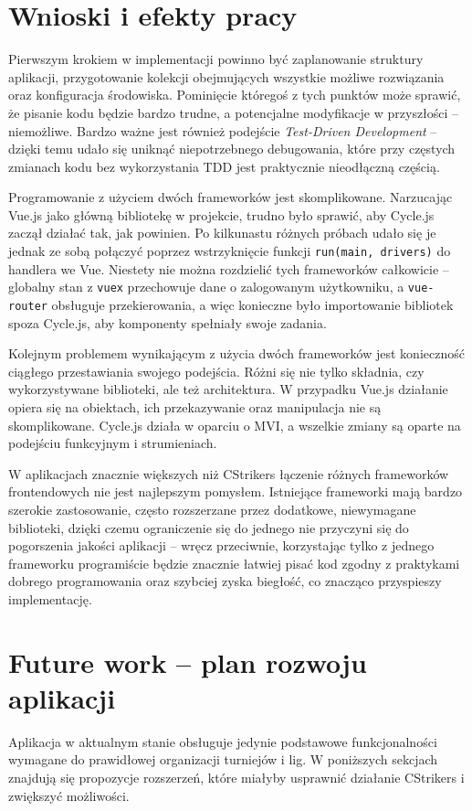 \documentclass[shortabstract]{iithesis}
\theoremstyle{definition} \newtheorem{definition}{Definicja}[]
\theoremstyle{remark} \newtheorem{remark}[definition]{Observation}
\theoremstyle{plain} \newtheorem{theorem}[definition]{Theorem}
\theoremstyle{plain} \newtheorem{lemma}[definition]{Lemma}
\begin{document}
\section{Wnioski i efekty pracy}
Pierwszym krokiem w implementacji powinno być zaplanowanie struktury aplikacji, przygotowanie kolekcji obejmujących wszystkie możliwe rozwiązania oraz konfiguracja środowiska. Pominięcie któregoś z tych punktów może sprawić, że pisanie kodu będzie bardzo trudne, a potencjalne modyfikacje w przyszłości -- niemożliwe. Bardzo ważne jest również podejście \textit{Test-Driven Development} -- dzięki temu udało się uniknąć niepotrzebnego debugowania, które przy częstych zmianach kodu bez wykorzystania TDD jest praktycznie nieodłączną częścią.

Programowanie z użyciem dwóch frameworków jest skomplikowane. Narzucając Vue.js jako główną bibliotekę w projekcie, trudno było sprawić, aby Cycle.js zaczął działać tak, jak powinien. Po kilkunastu różnych próbach udało się je jednak ze sobą połączyć poprzez wstrzyknięcie funkcji \texttt{run(main, drivers)} do handlera we Vue. Niestety nie można rozdzielić tych frameworków całkowicie -- globalny stan z \texttt{vuex} przechowuje dane o zalogowanym użytkowniku, a \texttt{vue-router} obsługuje przekierowania, a więc konieczne było importowanie bibliotek spoza Cycle.js, aby komponenty spełniały swoje zadania.

Kolejnym problemem wynikającym z użycia dwóch frameworków jest konieczność ciągłego przestawiania swojego podejścia. Różni się nie tylko składnia, czy wykorzystywane biblioteki, ale też architektura. W przypadku Vue.js działanie opiera się na obiektach, ich przekazywanie oraz manipulacja nie są skomplikowane. Cycle.js działa w oparciu o MVI, a wszelkie zmiany są oparte na podejściu funkcyjnym i strumieniach.

W aplikacjach znacznie większych niż CStrikers łączenie różnych frameworków frontendowych nie jest najlepszym pomysłem. Istniejące frameworki mają bardzo szerokie zastosowanie, często rozszerzane przez dodatkowe, niewymagane biblioteki, dzięki czemu ograniczenie się do jednego nie przyczyni się do pogorszenia jakości aplikacji -- wręcz przeciwnie, korzystając tylko z jednego frameworku programiście będzie znacznie łatwiej pisać kod zgodny z praktykami dobrego programowania oraz szybciej zyska biegłość, co znacząco przyspieszy implementację.

\section{Future work -- plan rozwoju aplikacji}
Aplikacja w aktualnym stanie obsługuje jedynie podstawowe funkcjonalności wymagane do prawidłowej organizacji turniejów i lig. W poniższych sekcjach znajdują się propozycje rozszerzeń, które miałyby usprawnić działanie CStrikers i zwiększyć możliwości.
\end{document}
